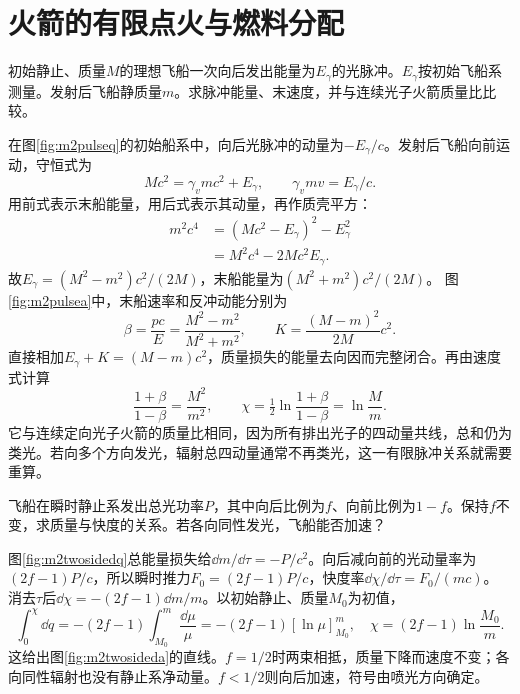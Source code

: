 \section{火箭的有限点火与燃料分配}
\begin{example}\label{ex:m2finitepulse}
初始静止、质量$M$的理想飞船一次向后发出能量为$E_\gamma$的光脉冲。$E_\gamma$按初始飞船系测量。发射后飞船静质量$m$。求脉冲能量、末速度，并与连续光子火箭质量比比较。
\end{example}
\begin{solution}
在图\ref{fig:m2pulseq}的初始船系中，向后光脉冲的动量为$-E_\gamma/c$。发射后飞船向前运动，守恒式为
\[
 Mc^2=\gamma_vmc^2+E_\gamma,\qquad
 \gamma_vmv=E_\gamma/c.
\]
用前式表示末船能量，用后式表示其动量，再作质壳平方：
\begin{align*}
 m^2c^4&=(Mc^2-E_\gamma)^2-E_\gamma^2\\
 &=M^2c^4-2Mc^2E_\gamma.
\end{align*}
故$E_\gamma=(M^2-m^2)c^2/(2M)$，末船能量为$(M^2+m^2)c^2/(2M)$。
图\ref{fig:m2pulsea}中，末船速率和反冲动能分别为
\[
 \beta=\frac{pc}{E}=\frac{M^2-m^2}{M^2+m^2},\qquad
 K=\frac{(M-m)^2}{2M}c^2.
\]
直接相加$E_\gamma+K=(M-m)c^2$，质量损失的能量去向因而完整闭合。再由速度式计算
\[
 \frac{1+\beta}{1-\beta}=\frac{M^2}{m^2},\qquad
 \chi=\tfrac12\ln\frac{1+\beta}{1-\beta}=\ln\frac Mm.
\]
它与连续定向光子火箭的质量比相同，因为所有排出光子的四动量共线，总和仍为类光。若向多个方向发光，辐射总四动量通常不再类光，这一有限脉冲关系就需要重算。
\end{solution}

\begin{example}\label{ex:m2twosided}
飞船在瞬时静止系发出总光功率$P$，其中向后比例为$f$、向前比例为$1-f$。保持$f$不变，求质量与快度的关系。若各向同性发光，飞船能否加速？
\end{example}
\begin{solution}
图\ref{fig:m2twosidedq}总能量损失给$\dd m/\dd\tau=-P/c^2$。向后减向前的光动量率为$(2f-1)P/c$，所以瞬时推力$F_0=(2f-1)P/c$，快度率$\dd\chi/\dd\tau=F_0/(mc)$。
消去$\tau$后$\dd\chi=-(2f-1)\dd m/m$。以初始静止、质量$M_0$为初值，
\[
 \int_0^\chi\dd q=-(2f-1)\int_{M_0}^{m}\frac{\dd\mu}{\mu}
 =-(2f-1)[\ln\mu]_{M_0}^{m},
 \quad \chi=(2f-1)\ln\frac{M_0}{m}.
\]
这给出图\ref{fig:m2twosideda}的直线。$f=1/2$时两束相抵，质量下降而速度不变；各向同性辐射也没有静止系净动量。$f<1/2$则向后加速，符号由喷光方向确定。
\end{solution}

